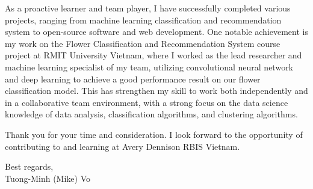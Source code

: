 \documentclass[a4paper,11pt]{article}
\newcommand{\p}[1]{#1\\\vspace{6pt}}
\begin{document}
\p{As a proactive learner and team player, I have successfully completed various projects, ranging from machine learning classification and recommendation system to open-source software and web development. One notable achievement is my work on the Flower Classification and Recommendation System course project at RMIT University Vietnam, where I worked as the lead researcher and machine learning specialist of my team, utilizing convolutional neural network and deep learning to achieve a good performance result on our flower classification model. This has strengthen my skill to work both independently and in a collaborative team environment, with a strong focus on the data science knowledge of data analysis, classification algorithms, and clustering algorithms.}

\p{Thank you for your time and consideration. I look forward to the opportunity of contributing to and learning at Avery Dennison RBIS Vietnam.}

\p{Best regards,\\
Tuong-Minh (Mike) Vo}
%
\end{document}
